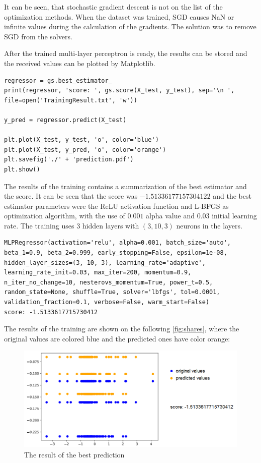 It can be seen, that stochastic gradient descent is not on the list of the optimization methods. When the dataset was trained, SGD causes NaN or infinite values during the calculation of the gradients. The solution was to remove SGD from the solvers. \medskip

After the trained multi-layer perceptron is ready, the results can be stored and the received values can be plotted by Matplotlib.
\begin{lstlisting}
regressor = gs.best_estimator_
print(regressor, 'score: ', gs.score(X_test, y_test), sep='\n ', file=open('TrainingResult.txt', 'w'))

y_pred = regressor.predict(X_test)

plt.plot(X_test, y_test, 'o', color='blue')
plt.plot(X_test, y_pred, 'o', color='orange')
plt.savefig('./' + 'prediction.pdf')
plt.show()
\end{lstlisting}
The results of the training contains a summarization of the best estimator and the score. It can be seen that the score was $-1.51336177157304122$ and the best estimator parameters were the ReLU activation function and L-BFGS as optimization algorithm, with the use of $0.001$ alpha value and $0.03$ initial learning rate. The training uses $3$ hidden layers with $(3,10,3)$ neurons in the layers.
\begin{lstlisting}
MLPRegressor(activation='relu', alpha=0.001, batch_size='auto', beta_1=0.9, beta_2=0.999, early_stopping=False, epsilon=1e-08, hidden_layer_sizes=(3, 10, 3), learning_rate='adaptive', learning_rate_init=0.03, max_iter=200, momentum=0.9, n_iter_no_change=10, nesterovs_momentum=True, power_t=0.5, random_state=None, shuffle=True, solver='lbfgs', tol=0.0001, validation_fraction=0.1, verbose=False, warm_start=False)
score: -1.5133617715730412
\end{lstlisting}

\smallskip The results of the training are shown on the following \autoref{fig:shares}, where the original values are colored blue and the predicted ones have color orange:
\begin{figure}[h]
	\centering
	\includegraphics[height=0.38\linewidth]{./figures/prediction}
	\caption{The result of the best prediction}
	\label{fig:shares}
\end{figure}

